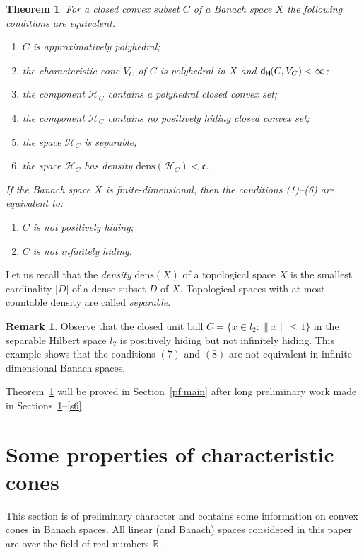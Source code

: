 \documentclass{amsart}
\newcommand{\IR}{\mathbb R}
\newcommand{\HH}{\mathcal H}
\newcommand{\dens}{\mathrm{dens}}
\newcommand{\dH}{\mathsf{d}_{\mathsf H}\kern-1pt}
\newtheorem{theorem}{Theorem}[section]
\theoremstyle{definition}
\newtheorem{remark}{Remark}
\begin{document}
\begin{theorem}\label{main} For a closed convex subset $C$ of a Banach space $X$ the following conditions are equivalent:
\begin{enumerate}
\item $C$ is approximatively polyhedral;
\item the characteristic cone $V_C$ of $C$ is polyhedral in $X$ and $\dH(C,V_C)<\infty$;
\item the component $\HH_C$ contains a polyhedral closed convex set;
\item the component $\HH_C$ contains no positively hiding closed convex set;
\item the space $\HH_C$ is separable;
\item the space $\HH_C$ has density $\dens(\HH_C)<\mathfrak c$.
\end{enumerate}
If the Banach space $X$ is finite-dimensional, then the conditions (1)--(6) are equivalent to:
\begin{enumerate}
\item[(7)] $C$ is not positively hiding;
\item[(8)] $C$ is not infinitely hiding.
\end{enumerate}
\end{theorem}


Let us recall that the {\em density} $\dens(X)$ of a topological space $X$ is the smallest cardinality $|D|$ of a dense subset $D$ of $X$. Topological spaces with at most countable density are called {\em separable}.


\begin{remark} Observe that the closed unit ball $C=\{x\in l_2:\|x\|\le 1\}$ in the separable Hilbert space $l_2$ is positively hiding but not infinitely hiding. This example shows that the conditions $(7)$ and $(8)$ are not equivalent in infinite-dimensional Banach spaces.
\end{remark}

Theorem~\ref{main} will be proved in Section~\ref{pf:main} after long preliminary work made in Sections~\ref{s2}--\ref{s6}.

\section{Some properties of characteristic cones}\label{s2}

This section is of preliminary character and contains some information on convex cones in Banach spaces. All linear (and Banach) spaces considered in this paper are over the field of real numbers $\IR$.
\end{document}
